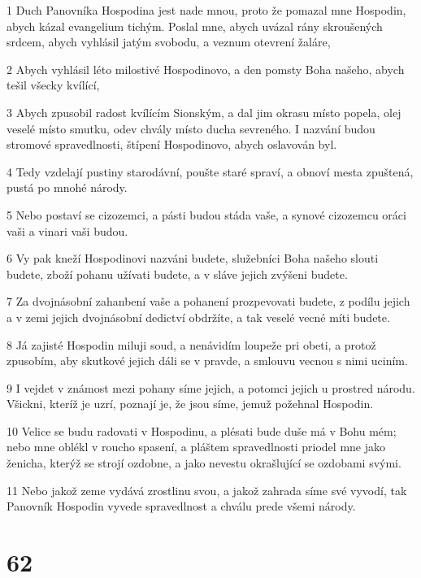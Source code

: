 \par 1 Duch Panovníka Hospodina jest nade mnou, proto že pomazal mne Hospodin, abych kázal evangelium tichým. Poslal mne, abych uvázal rány skroušených srdcem, abych vyhlásil jatým svobodu, a veznum otevrení žaláre,
\par 2 Abych vyhlásil léto milostivé Hospodinovo, a den pomsty Boha našeho, abych tešil všecky kvílící,
\par 3 Abych zpusobil radost kvílícím Sionským, a dal jim okrasu místo popela, olej veselé místo smutku, odev chvály místo ducha sevreného. I nazvání budou stromové spravedlnosti, štípení Hospodinovo, abych oslavován byl.
\par 4 Tedy vzdelají pustiny starodávní, poušte staré spraví, a obnoví mesta zpuštená, pustá po mnohé národy.
\par 5 Nebo postaví se cizozemci, a pásti budou stáda vaše, a synové cizozemcu oráci vaši a vinari vaši budou.
\par 6 Vy pak kneží Hospodinovi nazváni budete, služebníci Boha našeho slouti budete, zboží pohanu užívati budete, a v sláve jejich zvýšeni budete.
\par 7 Za dvojnásobní zahanbení vaše a pohanení prozpevovati budete, z podílu jejich a v zemi jejich dvojnásobní dedictví obdržíte, a tak veselé vecné míti budete.
\par 8 Já zajisté Hospodin miluji soud, a nenávidím loupeže pri obeti, a protož zpusobím, aby skutkové jejich dáli se v pravde, a smlouvu vecnou s nimi uciním.
\par 9 I vejdet v známost mezi pohany síme jejich, a potomci jejich u prostred národu. Všickni, kteríž je uzrí, poznají je, že jsou síme, jemuž požehnal Hospodin.
\par 10 Velice se budu radovati v Hospodinu, a plésati bude duše má v Bohu mém; nebo mne oblékl v roucho spasení, a pláštem spravedlnosti priodel mne jako ženicha, kterýž se strojí ozdobne, a jako nevestu okrašlující se ozdobami svými.
\par 11 Nebo jakož zeme vydává zrostlinu svou, a jakož zahrada síme své vyvodí, tak Panovník Hospodin vyvede spravedlnost a chválu prede všemi národy.

\chapter{62}

